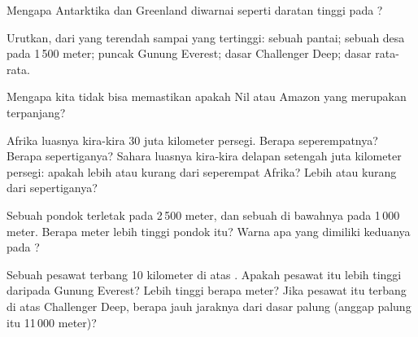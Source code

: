 \begin{exercise}[$\star$]\label{exo:g4:world-physical-map:6}
Mengapa Antarktika dan Greenland diwarnai seperti daratan tinggi pada ?
\end{exercise}

\begin{exercise}[$\star\star$]\label{exo:g4:world-physical-map:7}
Urutkan, dari yang terendah sampai yang tertinggi: sebuah pantai; sebuah
desa pada 1\,500 meter; puncak Gunung Everest; dasar Challenger Deep; dasar
 rata-rata.
\end{exercise}

\begin{exercise}[$\star\star$]\label{exo:g4:world-physical-map:8}
Mengapa kita tidak bisa memastikan apakah Nil atau Amazon yang merupakan
 terpanjang?
\end{exercise}

\begin{exercise}[$\star\star$]\label{exo:g4:world-physical-map:9}
Afrika luasnya kira-kira 30 juta kilometer persegi. Berapa seperempatnya?
Berapa sepertiganya? Sahara luasnya kira-kira delapan setengah juta
kilometer persegi: apakah lebih atau kurang dari seperempat Afrika? Lebih
atau kurang dari sepertiganya?
\end{exercise}

\begin{exercise}[$\star\star$]\label{exo:g4:world-physical-map:10}
Sebuah pondok  terletak pada 2\,500 meter, dan sebuah  di
bawahnya pada 1\,000 meter. Berapa meter lebih tinggi pondok itu? Warna
apa yang dimiliki keduanya pada ?
\end{exercise}

\begin{exercise}[$\star\star\star$]\label{exo:g4:world-physical-map:11}
Sebuah pesawat terbang 10 kilometer di atas . Apakah pesawat
itu lebih tinggi daripada Gunung Everest? Lebih tinggi berapa meter? Jika
pesawat itu terbang di atas Challenger Deep, berapa jauh jaraknya dari dasar
palung (anggap palung itu 11\,000 meter)?
\end{exercise}
